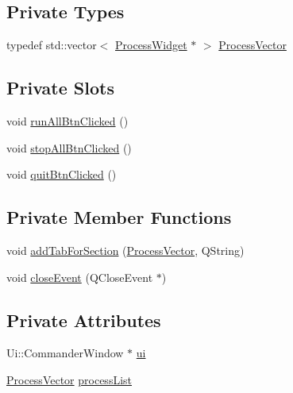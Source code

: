 \subsection*{Private Types}
\begin{DoxyCompactItemize}
\item 
typedef std\+::vector$<$ \hyperlink{classProcessWidget}{Process\+Widget} $\ast$ $>$ \hyperlink{classCommanderWindow_a6ce3c6ee250d3bd974b4e84a8cb050e6}{Process\+Vector}
\end{DoxyCompactItemize}
\subsection*{Private Slots}
\begin{DoxyCompactItemize}
\item 
void \hyperlink{classCommanderWindow_a2897a990e756136b27d141dfe834691b}{run\+All\+Btn\+Clicked} ()
\item 
void \hyperlink{classCommanderWindow_a8c18e4ae3655404a6f70edb4bd21db67}{stop\+All\+Btn\+Clicked} ()
\item 
void \hyperlink{classCommanderWindow_acb337a9b8ad91ef99bf793261d7646e5}{quit\+Btn\+Clicked} ()
\end{DoxyCompactItemize}
\subsection*{Private Member Functions}
\begin{DoxyCompactItemize}
\item 
void \hyperlink{classCommanderWindow_afe3aef9b42742cc00abd5d98f4e84713}{add\+Tab\+For\+Section} (\hyperlink{classCommanderWindow_a6ce3c6ee250d3bd974b4e84a8cb050e6}{Process\+Vector}, Q\+String)
\item 
void \hyperlink{classCommanderWindow_a013f15ff4948746b2d5862a319659012}{close\+Event} (Q\+Close\+Event $\ast$)
\end{DoxyCompactItemize}
\subsection*{Private Attributes}
\begin{DoxyCompactItemize}
\item 
Ui\+::\+Commander\+Window $\ast$ \hyperlink{classCommanderWindow_a6f1732d4f0314d6dd622b0b0cbcab14b}{ui}
\item 
\hyperlink{classCommanderWindow_a6ce3c6ee250d3bd974b4e84a8cb050e6}{Process\+Vector} \hyperlink{classCommanderWindow_ace4ad7bb7899523562dd8548b41c4131}{process\+List}
\end{DoxyCompactItemize}


